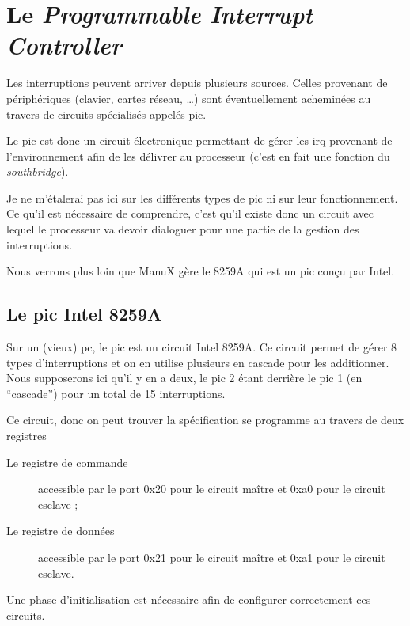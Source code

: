 \section{Le {\em Programmable Interrupt Controller}}

   Les interruptions peuvent arriver depuis plusieurs sources. Celles
provenant de périphériques (clavier, cartes réseau, \ldots) sont
éventuellement acheminées au travers de circuits spécialisés appelés
{\sc pic}.

   Le {\sc pic} est donc un circuit électronique permettant de gérer les
{\sc irq} provenant de l'environnement afin de les délivrer au
processeur (c'est en fait une fonction du {\em southbridge}).

   Je ne m'étalerai pas ici sur les différents types de {\sc pic} ni
sur leur fonctionnement. Ce qu'il est nécessaire de comprendre, c'est
qu'il existe donc un circuit avec lequel le processeur va devoir
dialoguer pour une partie de la gestion des interruptions.

   Nous verrons plus loin que ManuX gère le 8259A qui est un {\sc pic}
conçu par Intel.

%
\subsection{Le {\sc pic} Intel 8259A}

   Sur un (vieux) {\sc pc}, le {\sc pic} est un circuit Intel 8259A. Ce
circuit permet de gérer 8 types d'interruptions et on en utilise
plusieurs en cascade pour les additionner. Nous supposerons ici qu'il
y en a deux, le {\sc pic} 2 étant derrière le {\sc pic} 1 (en
``cascade'') pour un total de 15 interruptions.

   Ce circuit, donc on peut trouver la spécification
\cite{intel-8259a-spec} se programme au travers de deux registres

\begin{description}
    \item[Le registre de commande] accessible par le port 0x20 pour le
      circuit maître et 0xa0 pour le circuit esclave ;
    \item[Le registre de données] accessible par le port 0x21 pour le
      circuit maître et 0xa1 pour le circuit esclave.
\end{description}

   Une phase d'initialisation est nécessaire afin de configurer
correctement ces circuits.
   
